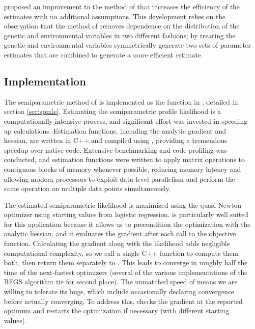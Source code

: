 \documentclass[nojss]{jss}
\begin{document}
\citet{Wang2018unpublished} proposed an improvement to the method of
\citet{Stalder2017} that increases the efficiency of the estimates with
no additional assumptions. This development relies on the observation
that the method of \citeauthor{Stalder2017} removes dependence on the
distribution of the genetic and environmental variables in two different
fashions; by treating the genetic and environmental variables
symmetrically \citeauthor{Wang2018unpublished} generate two sets of
parameter estimates that are combined to generate a more efficient
estimate.

\subsection{Implementation}

The semiparametric method of \citet{Stalder2017} is implemented as the
function  in , detailed in section
\ref{sec:spmle}. Estimating the semiparametric profile likelihood is a
computationally intensive process, and significant effort was invested
in speeding up calculations. Estimation functions, including the
analytic gradient and hessian, are written in C++ and compiled using
 \citep{Eddelbuettel2013Rcpp}, providing a tremendous speedup
over native  code. Extensive benchmarking and code profiling
was conducted, and estimation functions were written to apply matrix
operations to contiguous blocks of memory whenever possible, reducing
memory latency and allowing modern processors to exploit data level
parallelism and perform the same operation on multiple data points
simultaneously.

The estimated semiparametric likelihood is maximized using the
quasi-Newton optimizer  \citep{Nielsen2016ucminf} using
starting values from logistic regression.  is particularly
well suited for this application because it allows us to precondition
the optimization with the analytic hessian, and it evaluates the
gradient after each call to the objective function. Calculating the
gradient along with the likelihood adds negligible computational
complexity, so we call a single C++ function to compute them both, then
return them separately to . This leads  to
converge in roughly half the time of the next-fastest optimizers
(several of the various  implementations of the BFGS
algorithm tie for second place). The unmatched speed of 
means we are willing to tolerate its bugs, which include occasionally
declaring convergence before actually converging. To address this,
 checks the gradient at the reported optimum and restarts
the optimization if necessary (with different starting values).
\end{document}
